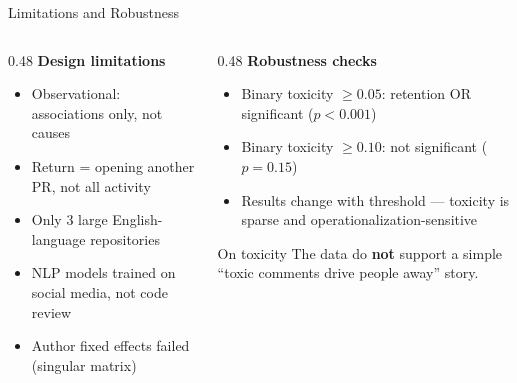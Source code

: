 \documentclass[aspectratio=169,11pt]{beamer}
\begin{document}
\begin{frame}{Limitations and Robustness}
\begin{columns}[T]
\begin{column}{0.48\textwidth}
\textbf{Design limitations}
\begin{itemize}
  \item Observational: associations only, not causes
  \item Return = opening another PR, not all activity
  \item Only 3 large English-language repositories
  \item NLP models trained on social media, not code review
  \item Author fixed effects failed (singular matrix)
\end{itemize}
\end{column}

\begin{column}{0.48\textwidth}
\textbf{Robustness checks}
\begin{itemize}
  \item Binary toxicity $\geq 0.05$: retention OR significant ($p < 0.001$)
  \item Binary toxicity $\geq 0.10$: not significant ($p = 0.15$)
  \item Results change with threshold --- toxicity is sparse and operationalization-sensitive
\end{itemize}

\vspace{0.4em}
\begin{alertblock}{On toxicity}
The data do \textbf{not} support a simple ``toxic comments drive people away'' story.
\end{alertblock}
\end{column}
\end{columns}
\end{frame}
\end{document}
